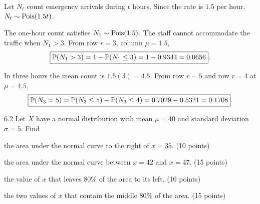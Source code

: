 \documentclass[11pt,oneside]{article}
\begin{document}
\begin{solution}
Let $N_t$ count emergency arrivals during $t$ hours. Since the rate is $1.5$ per hour, $N_t\sim\operatorname{Pois}(1.5t)$.
\begin{problemsubparts}
\item The one-hour count satisfies $N_1\sim\operatorname{Pois}(1.5)$. The staff cannot accommodate the traffic when $N_1>3$. From row $r=3$, column $\mu=1.5$,
\[
\boxed{\mathbb{P}(N_1>3)=1-\mathbb{P}(N_1\le3)=1-0.9344=0.0656}.
\]
\item In three hours the mean count is $1.5(3)=4.5$. From row $r=5$ and row $r=4$ at $\mu=4.5$,
\[
\boxed{\mathbb{P}(N_3=5)=\mathbb{P}(N_3\le5)-\mathbb{P}(N_3\le4)=0.7029-0.5321=0.1708}.
\]
\end{problemsubparts}
\end{solution}

\begin{problem}{6.2}
Let $X$ have a normal distribution with mean $\mu=40$ and standard deviation $\sigma=5$. Find
\begin{problemsubparts}
\item the area under the normal curve to the right of $x=35$. (10 points)
\item the area under the normal curve between $x=42$ and $x=47$. (15 points)
\item the value of $x$ that leaves $80\%$ of the area to its left. (10 points)
\item the two values of $x$ that contain the middle $80\%$ of the area. (15 points)
\end{problemsubparts}
\end{problem}
\end{document}
